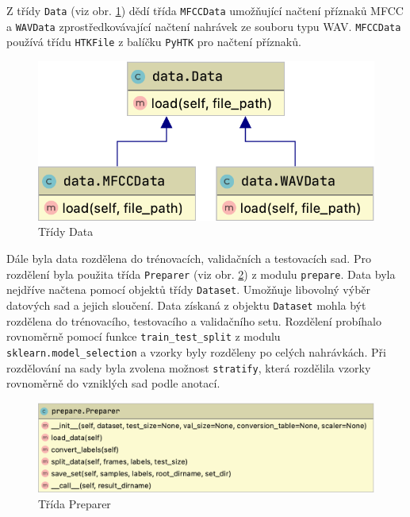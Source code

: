 \documentclass[FM,BP]{tulthesis}
\begin{document}
Z třídy \texttt{\mbox{Data}} (viz obr. \mbox{\ref{fig:data}}) dědí třída \texttt{\mbox{MFCCData}} umožňující načtení příznaků MFCC a \texttt{\mbox{WAVData}} zprostředkovávající načtení nahrávek ze souboru typu WAV. \texttt{\mbox{MFCCData}} používá třídu \texttt{\mbox{HTKFile}} z balíčku \texttt{\mbox{PyHTK}} pro načtení příznaků.

\begin{figure}[ht]
\centerline{\includegraphics[scale=.25,keepaspectratio]{data-data.png}}
\caption{Třídy Data}
\label{fig:data}
\end{figure}
\FloatBarrier

Dále byla data rozdělena do trénovacích, validačních a testovacích sad. Pro rozdělení byla použita třída \texttt{\mbox{Preparer}} (viz obr. \ref{fig:preparer}) z modulu \texttt{\mbox{prepare}}. Data byla nejdříve načtena pomocí objektů třídy \texttt{\mbox{Dataset}}. Umožňuje libovolný výběr datových sad a jejich sloučení. Data získaná z objektu \texttt{\mbox{Dataset}} mohla být rozdělena do trénovacího, testovacího a validačního setu. Rozdělení probíhalo rovnoměrně pomocí funkce \texttt{\mbox{train\_test\_split}} z modulu \texttt{\mbox{sklearn.model\_selection}} a vzorky byly rozděleny po celých nahrávkách. Při rozdělování na sady byla zvolena možnost \texttt{\mbox{stratify}}, která rozdělila vzorky rovnoměrně do vzniklých sad podle anotací.

\begin{figure}[ht]
\centerline{\includegraphics[scale=.25,keepaspectratio]{prepare.png}}
\caption{Třída Preparer}
\label{fig:preparer}
\end{figure}
\FloatBarrier
\end{document}
